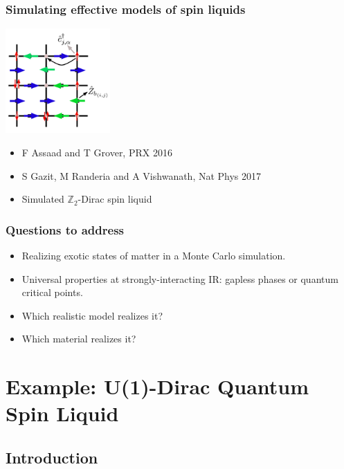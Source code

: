 \documentclass[xcolor=table, 10pt, aspectratio=43]{beamer}
\begin{document}
\begin{frame}
	\frametitle{Simulating effective models of spin liquids}
		\begin{center}
			\includegraphics[width=4cm]{../orthogonal_metal/z2dsl}
		\end{center}
		\begin{itemize}
			\item F Assaad and T Grover, PRX 2016
			\item S Gazit, M Randeria and A Vishwanath, Nat Phys 2017
			\item Simulated $\mathbb Z_2$-Dirac spin liquid
		\end{itemize}
\end{frame}

\begin{frame}
	\frametitle{Questions to address}
	\begin{itemize}
		\item[\ding{51}] Realizing exotic states of matter in a Monte Carlo simulation.
		\item[\ding{51}] Universal properties at strongly-interacting IR: gapless phases or quantum critical points.
		\item[\ding{55}] Which realistic model realizes it?
		\item[\ding{55}] Which material realizes it?
	\end{itemize}

\end{frame}

\section{Example: U(1)-Dirac Quantum Spin Liquid}

\subsection{Introduction}
\end{document}
